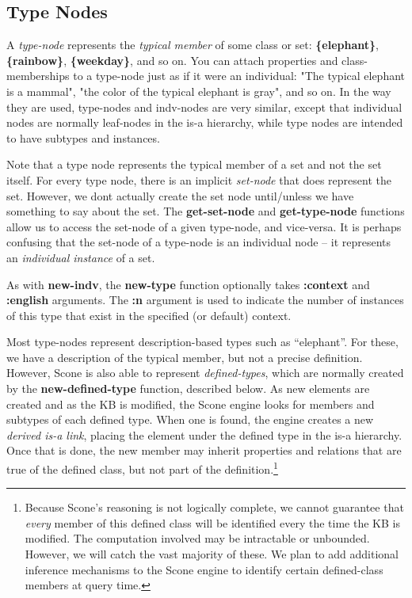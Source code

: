 \documentclass[titlepage,twoside,openright,11pt]{article}
\begin{document}
\subsection{Type Nodes}\label{type-nodes}

A \emph{type-node} represents the \emph{typical member} of some class or
set: \textbf{\{elephant\}}, \textbf{\{rainbow\}}, \textbf{\{weekday\}},
and so on. You can attach properties and class-memberships to a
type-node just as if it were an individual: "The typical elephant is a
mammal", "the color of the typical elephant is gray", and so on. In the
way they are used, type-nodes and indv-nodes are very similar, except
that individual nodes are normally leaf-nodes in the is-a hierarchy,
while type nodes are intended to have subtypes and instances.

Note that a type node represents the typical member of a set and not the
set itself. For every type node, there is an implicit \emph{set-node}
that does represent the set. However, we don\textquotesingle t actually
create the set node until/unless we have something to say about the set.
The \textbf{get-set-node} and \textbf{get-type-node} functions allow us
to access the set-node of a given type-node, and vice-versa. It is
perhaps confusing that the set-node of a type-node is an individual node
-- it represents an \emph{individual instance} of a set.

As with \textbf{new-indv}, the \textbf{new-type} function optionally
takes \textbf{:context} and \textbf{:english} arguments. The \textbf{:n}
argument is used to indicate the number of instances of this type that
exist in the specified (or default) context.

Most type-nodes represent description-based types such as ``elephant''.
For these, we have a description of the typical member, but not a
precise definition. However, Scone is also able to represent
\emph{defined-types}, which are normally created by the
\textbf{new-defined-type} function, described below. As new elements are
created and as the KB is modified, the Scone engine looks for members
and subtypes of each defined type. When one is found, the engine creates
a new \emph{derived is-a link}, placing the element under the defined
type in the is-a hierarchy. Once that is done, the new member may
inherit properties and relations that are true of the defined class, but
not part of the definition.\footnote{Because Scone's reasoning is not
  logically complete, we cannot guarantee that \emph{every} member of
  this defined class will be identified every the time the KB is
  modified. The computation involved may be intractable or unbounded.
  However, we will catch the vast majority of these. We plan to add
  additional inference mechanisms to the Scone engine to identify
  certain defined-class members at query time.}
\end{document}
